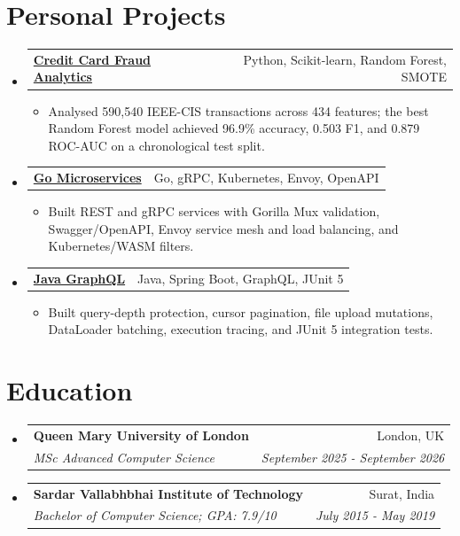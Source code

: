 \documentclass[a4paper,10pt]{article}
\makeatletter
\newcommand{\resumeItem}[1]{\item {\small #1}}
\newcommand{\resumeSubheading}[4]{
  \item
  \begin{tabular*}{1.0\textwidth}[t]{l@{\extracolsep{\fill}}r}
    \textbf{#1} & {\small #2} \\
    \textit{\small #3} & \textit{\small #4} \\
  \end{tabular*}\vspace{-4pt}
}
\newcommand{\resumeProjectHeading}[2]{
  \item
  \begin{tabular*}{1.0\textwidth}[t]{l@{\extracolsep{\fill}}r}
    \textbf{#1} & {\small #2} \\
  \end{tabular*}\vspace{-6pt}
}
\newcommand{\resumeSubHeadingListStart}{\begin{itemize}[leftmargin=0in,label={}]}
\newcommand{\resumeSubHeadingListEnd}{\end{itemize}}
\newcommand{\resumeItemListStart}{\begin{itemize}}
\newcommand{\resumeItemListEnd}{\end{itemize}\vspace{-2pt}}
\makeatother
\begin{document}
\section{Personal Projects}
\resumeSubHeadingListStart
    \resumeProjectHeading
      {\href{https://github.com/aymanapatel/qmul-all-projects/blob/main/data-analytics/coursework1/credit-card-report.pdf}{Credit Card Fraud Analytics}}{Python, Scikit-learn, Random Forest, SMOTE}
      \resumeItemListStart
        \resumeItem{Analysed 590,540 IEEE-CIS transactions across 434 features; the best Random Forest model achieved 96.9\% accuracy, 0.503 F1, and 0.879 ROC-AUC on a chronological test split.}
      \resumeItemListEnd

    \resumeProjectHeading
      {\href{https://github.com/aymanapatel/golang-microservices}{Go Microservices}}{Go, gRPC, Kubernetes, Envoy, OpenAPI}
      \resumeItemListStart
        \resumeItem{Built REST and gRPC services with Gorilla Mux validation, Swagger/OpenAPI, Envoy service mesh and load balancing, and Kubernetes/WASM filters.}
      \resumeItemListEnd

    \resumeProjectHeading
      {\href{https://github.com/aymanapatel/graphql-app}{Java GraphQL}}{Java, Spring Boot, GraphQL, JUnit 5}
      \resumeItemListStart
        \resumeItem{Built query-depth protection, cursor pagination, file upload mutations, DataLoader batching, execution tracing, and JUnit 5 integration tests.}
      \resumeItemListEnd
\resumeSubHeadingListEnd

\section{Education}
\resumeSubHeadingListStart
  \resumeSubheading
    {Queen Mary University of London}{London, UK}
    {MSc Advanced Computer Science}{September 2025 - September 2026}
  \resumeSubheading
    {Sardar Vallabhbhai Institute of Technology}{Surat, India}
    {Bachelor of Computer Science; GPA: 7.9/10}{July 2015 - May 2019}
\resumeSubHeadingListEnd
\end{document}
